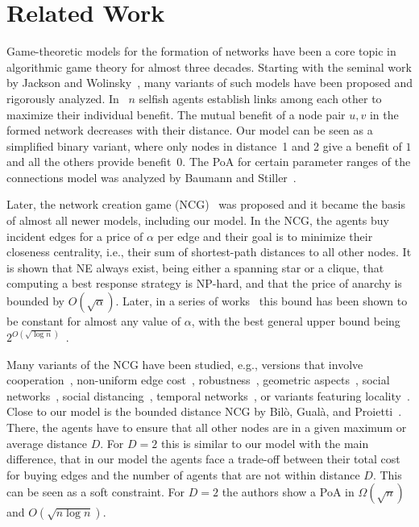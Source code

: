 \section{Related Work}
Game-theoretic models for the formation of networks have been a core topic in algorithmic game theory for almost three decades. Starting with the seminal work by Jackson and Wolinsky~\cite{JW96}, many variants of such models have been proposed and rigorously analyzed. In~\cite{JW96} $n$ selfish agents establish links among each other to maximize their individual benefit. The mutual benefit of a node pair $u,v$ in the formed network decreases with their distance. Our model can be seen as a simplified binary variant, where only nodes in distance~1 and 2 give a benefit of $1$ and all the others provide benefit~$0$. The PoA for certain parameter ranges of the connections model was analyzed by Baumann and Stiller~\cite{BS08}.

Later, the network creation game (NCG)~\cite{fabrikantNetwork2003} was proposed and it became the basis of almost all newer models, including our model. In the NCG, the agents buy incident edges for a price of $\alpha$ per edge and their goal is to minimize their closeness centrality, i.e., their sum of shortest-path distances to all other nodes. It is shown that NE always exist, being either a spanning star or a clique, that computing a best response strategy is NP-hard, and that the price of anarchy is bounded by $O(\sqrt{\alpha})$. Later, in a series of works~\cite{albersNash2014,demainePrice2007,MS10,MMM13,GHLL16,AM19,BL20,AB23} this bound has been shown to be constant for almost any value of $\alpha$, with the best general upper bound being $2^{O(\sqrt{\log n})}$~\cite{demainePrice2007}.

Many variants of the NCG have been studied, e.g., versions that involve cooperation~\cite{CP05,AFM09,FGLZ23}, non-uniform edge cost~\cite{MeiromMO14,CLMH14,CLMM17,BiloFLLM21}, robustness~\cite{MeiromMO15,CLMM16,Goyal16,Echzell0LM20}, geometric aspects~\cite{MoscibrodaSW06a,EidenbenzKZ06,bilo2019}, social networks~\cite{BiloFLLM21}, social distancing~\cite{social_distancing}, temporal networks~\cite{temporal_NCG,temporal_non_local}, or variants featuring locality~\cite{CL15,BiloGLP16,bilo_traceroute}. 
Close to our model is the bounded distance NCG by Bilò, Gualà, and Proietti~\cite{BiloGP15}. 
There, the agents have to ensure that all other nodes are in a given maximum or average distance $D$. For $D=2$ this is similar to our model with the main difference, that in our model the agents face a trade-off between their total cost for buying edges and the number of agents that are not within distance $D$. This can be seen as a soft constraint. For $D=2$ the authors show a PoA in $\Omega(\sqrt{n})$ and $O(\sqrt{n\log n})$.


